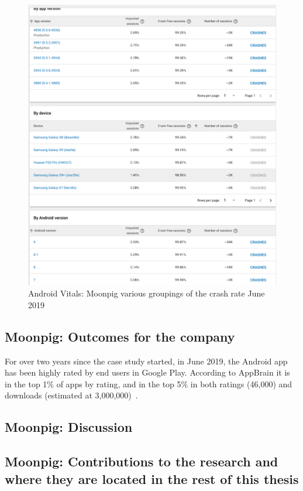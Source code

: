 \begin{figure}
    \centering
    \includegraphics[width=13cm]{images/android-vitals-screenshots/moonpig/Screenshot 2019-06-10 at 15.41.23.png}
    \caption{Android Vitals: Moonpig various groupings of the crash rate  June 2019}
    \label{fig:av-moonpig-crash-rate-groupings}
\end{figure}

\subsection{Moonpig: Outcomes for the company}
For over two years since the case study started, in June 2019, the Android app has been highly rated by end users in Google Play. According to AppBrain it is in the top 1\% of apps by rating, and in the top 5\% in both ratings (46,000) and downloads (estimated at 3,000,000)~\citep{appbrain_moonpig}.

\subsection{Moonpig: Discussion}

\subsection{Moonpig: Contributions to the research and where they are located in the rest of this thesis}
